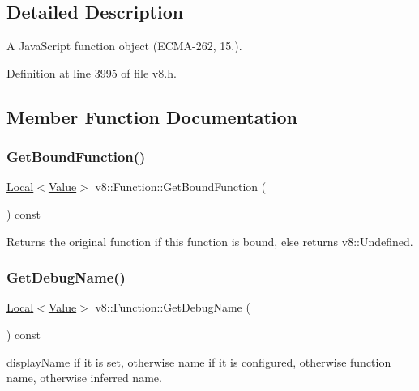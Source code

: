 \subsection{Detailed Description}
A Java\+Script function object (E\+C\+M\+A-\/262, 15.). 

Definition at line 3995 of file v8.\+h.



\subsection{Member Function Documentation}
\mbox{\label{classv8_1_1Function_a33bea08b5ff0c605bde07897cf1c431e}} 
\subsubsection{\texorpdfstring{Get\+Bound\+Function()}{GetBoundFunction()}}
{\footnotesize\ttfamily \mbox{\hyperlink{classv8_1_1Local}{Local}}$<$\mbox{\hyperlink{classv8_1_1Value}{Value}}$>$ v8\+::\+Function\+::\+Get\+Bound\+Function (\begin{DoxyParamCaption}{ }\end{DoxyParamCaption}) const}

Returns the original function if this function is bound, else returns v8\+::\+Undefined. \mbox{\label{classv8_1_1Function_a36946ff78ea0448d992957fa164187f1}} 
\subsubsection{\texorpdfstring{Get\+Debug\+Name()}{GetDebugName()}}
{\footnotesize\ttfamily \mbox{\hyperlink{classv8_1_1Local}{Local}}$<$\mbox{\hyperlink{classv8_1_1Value}{Value}}$>$ v8\+::\+Function\+::\+Get\+Debug\+Name (\begin{DoxyParamCaption}{ }\end{DoxyParamCaption}) const}

display\+Name if it is set, otherwise name if it is configured, otherwise function name, otherwise inferred name. \mbox{\label{classv8_1_1Function_aa889eb7452de7c7a695c5981f603c7cb}} 
